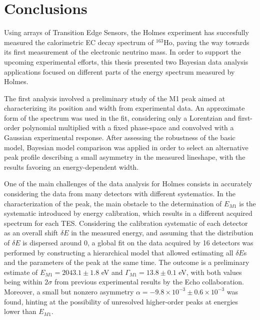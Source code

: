 \chapter*{Conclusions}
Using arrays of Transition Edge Sensors, the Holmes experiment has succesfully measured the calorimetric EC decay
spectrum of $^{163}$Ho, paving the way towards its first measurement of the electronic neutrino mass.
In order to support the upcoming experimental efforts, this thesis presented two Bayesian data analysis
applications focused on different parts of the energy spectrum measured by Holmes.

The first analysis involved a preliminary study of the M1 peak aimed at characterizing its position and width from
experimental data. An approximate form of the spectrum was used in the fit, considering only a Lorentzian and
first-order polynomial multiplied with a fixed phase-space and convolved with a Gaussian experimental response. After
assessing the robustness of the basic model, Bayesian model comparison was applied in order to select an alternative
peak profile describing a small asymmetry in the measured lineshape, with the results favoring an energy-dependent width.

One of the main challenges of the data analysis for Holmes consists in accurately considering the data from many
detectors with different systematics. In the characterization of the peak, the main obstacle to the determination of
\(E_{M1}\) is the systematic introduced by energy calibration, which results in a different acquired spectrum for
each TES. Considering the calibration systematic of each detector as an overall shift \(\delta E\) in the measured
energy, and assuming that the distribution of \(\delta E\) is dispersed around 0, a global fit on the data acquired by
16 detectors was performed by constructing a hierarchical model that allowed estimating all \(\delta E\)s and the
parameters of the peak at the same time. The outcome is a preliminary estimate of \(E_{M1} = 2043.1 \pm 1.8\) eV and
\(\Gamma_{M1} = 13.8 \pm 0.1\) eV, with both values being within $2\sigma$ from previous experimental results
by the Echo collaboration. Moreover, a small but nonzero asymmetry \(\alpha = -9.8 \times 10^{-3} \pm 0.6 \times 10^{-3}\) was found, hinting at the possibility of unresolved higher-order peaks at energies lower than \(E_{M1}\).


